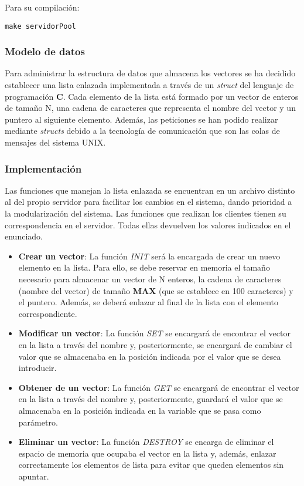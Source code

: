 \documentclass[10pt, spanish, pdftex]{template/UC3M_document}
\begin{document}
Para su compilación:
  \begin{lstlisting}[frame=single]
    make servidorPool
  \end{lstlisting}


\subsubsection{Modelo de datos}
Para administrar la estructura de datos que almacena los vectores se ha decidido establecer una lista enlazada implementada a través de un \textit{struct} del lenguaje de programación \textbf{C}. Cada elemento de la lista está formado por un vector de enteros de tamaño N, una cadena de caracteres que representa el nombre del vector y un puntero al siguiente elemento.
Además, las peticiones se han podido realizar mediante \textit{structs} debido a la tecnología de comunicación que son las colas de mensajes del sistema UNIX.

\subsubsection{Implementación}
Las funciones que manejan la lista enlazada se encuentran en un archivo distinto al del propio servidor para facilitar los cambios en el sistema, dando prioridad a la modularización del sistema. Las funciones que realizan los clientes tienen su correspondencia en el servidor. Todas ellas devuelven los valores indicados en el enunciado.
\begin{itemize}
    \item \textbf{Crear un vector}: La función \textit{INIT} será la encargada de crear un nuevo elemento en la lista. Para ello, se debe reservar en memoria el tamaño necesario para almacenar un vector de N enteros, la cadena de caracteres (nombre del vector) de tamaño \textbf{MAX} (que se establece en 100 caracteres) y el puntero. Además, se deberá enlazar al final de la lista con el elemento correspondiente.
    \item \textbf{Modificar un vector}: La función \textit{SET} se encargará de encontrar el vector en la lista a través del nombre y, posteriormente, se encargará de cambiar el valor que se almacenaba en la posición indicada por el valor que se desea introducir.
    \item \textbf{Obtener de un vector}: La función \textit{GET} se encargará de encontrar el vector en la lista a través del nombre y, posteriormente, guardará el valor que se almacenaba en la posición indicada en la variable que se pasa como parámetro.
    \item \textbf{Eliminar un vector}: La función \textit{DESTROY} se encarga de eliminar el espacio de memoria que ocupaba el vector en la lista y, además, enlazar correctamente los elementos de lista para evitar que queden elementos sin apuntar.
\end{itemize}
\end{document}
